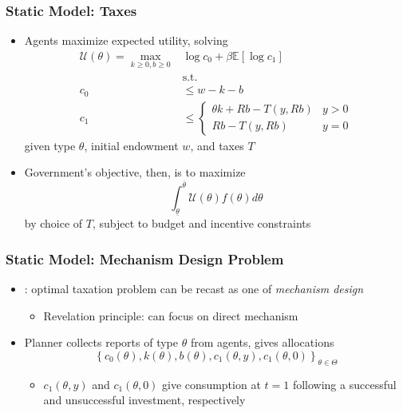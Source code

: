 \documentclass{beamer}
\newcommand{\U}{\mathcal{U}}
\begin{document}
\begin{frame}
    \frametitle{Static Model: Taxes}

    \begin{itemize}
        \item Agents maximize expected utility, solving 
        \begin{align*}
            \U\left(\theta\right)=\max_{k\ge 0,b\ge 0}&\log c_{0}+\beta\mathbb{E}\left[\log c_{1}\right]\\&\text{s.t.}\\c_{0}&\le w-k-b\\c_{1}&\le\begin{cases}
                \theta k+Rb-T\left(y,Rb\right) & y>0\\
                Rb-T\left(y,Rb\right) & y=0
                \end{cases}
        \end{align*}
        given type \( \theta \), initial endowment \( w \), and taxes \( T \)
        \item Government's objective, then, is to maximize 
        \begin{equation*}
            \int_{\underline{\theta}}^{\bar{\theta}}\U(\theta)f(\theta)d\theta \label{eqn:plan_obj}
        \end{equation*}
        by choice of \( T \), subject to budget and incentive constraints
    \end{itemize}

\end{frame}

\begin{frame}
    \frametitle{Static Model: Mechanism Design Problem}

    \begin{itemize}
        \item \cite{mirrlees1971exploration}: optimal taxation problem can be recast as one of \textit{mechanism design}
        \begin{itemize}
            \item Revelation principle: can focus on direct mechanism
        \end{itemize}
        \item Planner collects reports of type \( \theta \) from agents, gives allocations 
        \[ \left\{ c_{0}\left(\theta\right),k\left(\theta\right),b\left(\theta\right),c_{1}\left(\theta,y\right),c_{1}\left(\theta,0\right)\right\}_{\theta\in\Theta}  \]
        \begin{itemize}
            \item \( c_1\left( \theta,y \right) \) and \( c_1\left( \theta,0 \right) \) give consumption at \( t=1 \) following a successful and unsuccessful investment, respectively
        \end{itemize}
        
    \end{itemize}

\end{frame}
\end{document}
